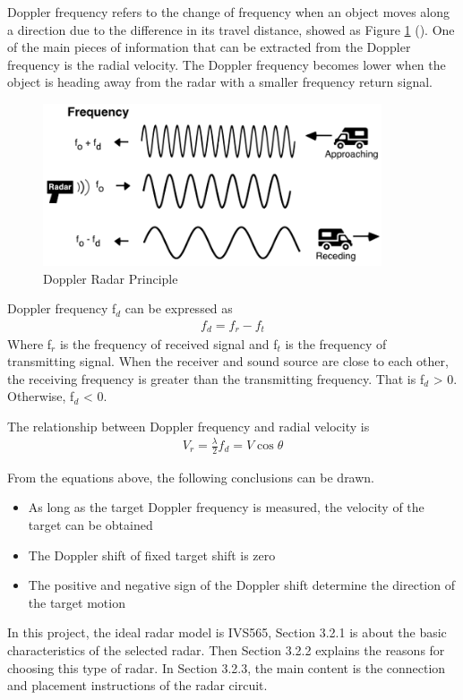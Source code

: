  Doppler frequency refers to the change of frequency when an object moves along a direction due to the difference in its travel distance, showed as Figure \ref{fig:doppler} (\cite{DopplerRader}). One of the main pieces of information that can be extracted from the Doppler frequency is the radial velocity. The Doppler frequency becomes lower when the object is heading away from the radar with a smaller frequency return signal.
 \begin{figure}[H]
    \centering
    \includegraphics[width=10cm]{figure/Radar.png}
    \caption{Doppler Radar Principle}
    \label{fig:doppler}
\end{figure}
Doppler frequency f$_d$ can be expressed as
\begin{align}
    f_{d}=f_{r}-f_{t}
\end{align}
Where f$_r$ is the frequency of received signal and f$_t$ is the frequency of transmitting signal. When the receiver and sound source are close to each other, the receiving frequency is greater than the transmitting frequency. That is f$_d$ > 0. Otherwise, f$_d$ < 0.

The relationship between Doppler frequency and  radial velocity is 
\begin{align}
V_{r}=\frac{\lambda}{2} f_{d}=V \cos \theta
\end{align}


From the equations above, the following conclusions can be drawn.
\begin{itemize}[noitemsep,topsep=0pt]
   \item As long as the target Doppler frequency is measured, the velocity of the target can be obtained
   \item The Doppler shift of fixed target  shift is zero
   \item The positive and negative sign of the Doppler shift determine the direction of the target motion
\end{itemize}

In this project, the ideal radar model is IVS565, Section 3.2.1 is about the basic characteristics of the selected radar. Then Section 3.2.2 explains the reasons for choosing this type of radar. In Section 3.2.3, the main content is the connection and placement instructions of the radar circuit.
